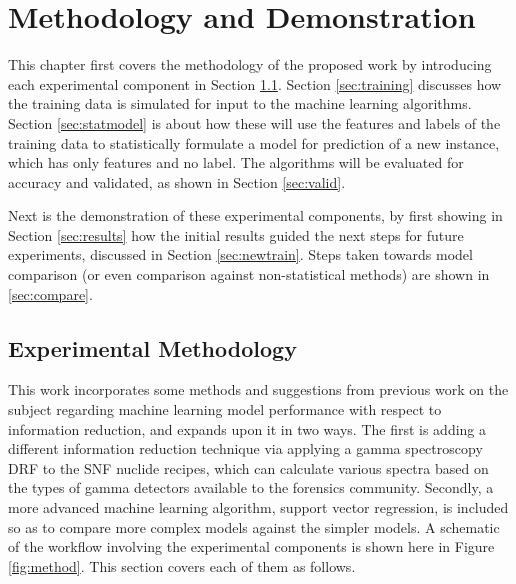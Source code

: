 \chapter{Methodology and Demonstration}
\label{ch:demo_method}

This chapter first covers the methodology of the proposed work by introducing
each experimental component in Section \ref{sec:expmeth}. Section
\ref{sec:training} discusses how the training data is simulated for input to
the machine learning algorithms.  Section \ref{sec:statmodel} is about how
these will use the features and labels of the training data to statistically
formulate a model for prediction of a new instance, which has only features and
no label.  The algorithms will be evaluated for accuracy and validated, as
shown in Section \ref{sec:valid}.

Next is the demonstration of these experimental components, by first showing in
Section \ref{sec:results} how the initial results guided the next steps for
future experiments, discussed in Section \ref{sec:newtrain}.  Steps taken
towards model comparison (or even comparison against non-statistical methods)
are shown in \ref{sec:compare}.

\section{Experimental Methodology}
\label{sec:expmeth}

This work incorporates some methods and suggestions from previous work on the
subject \cite{dayman_feasibility_2013} regarding machine learning model
performance with respect to information reduction, and expands upon it in two
ways. The first is adding a different information reduction technique via
applying a gamma spectroscopy \gls{DRF} to the \gls{SNF} nuclide recipes, which
can calculate various spectra based on the types of gamma detectors available
to the forensics community.  Secondly, a more advanced machine learning
algorithm, support vector regression, is included so as to compare more complex
models against the simpler models.  A schematic of the workflow involving
the experimental components is shown here in Figure \ref{fig:method}.  This
section covers each of them as follows.

